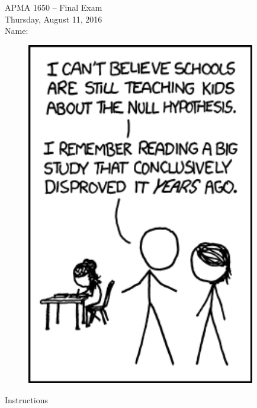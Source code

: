 \documentclass[12pt]{article}
\begin{document}
\title{}
\author{\vspace{-10ex} }

\begin{center}
{\LARGE APMA 1650 -- Final Exam}\\
\vspace{5mm}
{\large Thursday, August 11, 2016 }\\
\vspace{10mm}
{\large Name: }
\vspace{3cm}

\begin{figure}[H]
\centering
\includegraphics[width=10cm]{xkcd3}
\end{figure}

\end{center}
\pagebreak

\begin{center}
{\LARGE Instructions}\\
\vspace{5mm}
\end{center}
\end{document}
